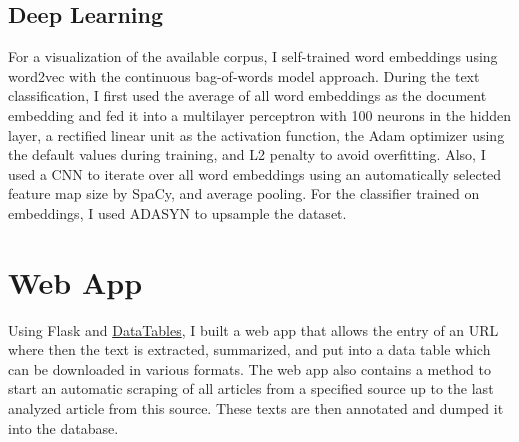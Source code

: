 \subsection{Deep Learning}
  For a visualization of the available corpus, I self-trained word embeddings using word2vec with the continuous bag-of-words model approach.
  During the text classification, I first used the average of all word embeddings as the document embedding and fed it into a multilayer perceptron with 100 neurons in the hidden layer, a rectified linear unit as the activation function, the Adam optimizer using the default values during training, and L2 penalty to avoid overfitting.
  Also, I used a CNN to iterate over all word embeddings using an automatically selected feature map size by SpaCy, and average pooling.
  For the classifier trained on embeddings, I used ADASYN to upsample the dataset.

\section{Web App}
  Using Flask and \href{https://www.datatables.net}{DataTables}, I built a web app that allows the entry of an URL where then the text is extracted, summarized, and put into a data table which can be downloaded in various formats.
  The web app also contains a method to start an automatic scraping of all articles from a specified source up to the last analyzed article from this source. These texts are then annotated and dumped it into the database.
